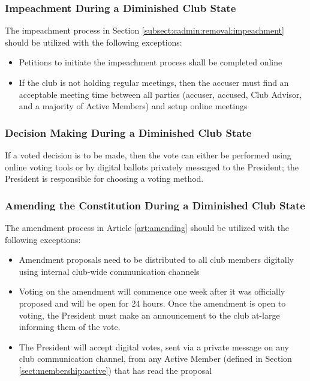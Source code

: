 \documentclass[english,11pt]{article}
\begin{document}
\subsubsection{Impeachment During a Diminished Club State} \label{subsect:reduced:impeachment}
The impeachment process in Section \ref{subsect:cadmin:removal:impeachment} should be utilized with the following exceptions:

\begin{itemize}
    \item Petitions to initiate the impeachment process shall be completed online
    \item If the club is not holding regular meetings, then the accuser must find an acceptable meeting time between all parties (accuser, accused, Club Advisor, and a majority of Active Members) and setup online meetings
\end{itemize}

\subsubsection{Decision Making During a Diminished Club State} \label{subsect:reduced:decisions}
If a voted decision is to be made, then the vote can either be performed using online voting tools or by digital ballots privately messaged to the President; the President is responsible for choosing a voting method.

\subsubsection{Amending the Constitution During a Diminished Club State} \label{subsect:reduced:amending}
The amendment process in Article \ref{art:amending} should be utilized with the following exceptions:

\begin{itemize}
    \item Amendment proposals need to be distributed to all club members digitally using internal club-wide communication channels
    \item Voting on the amendment will commence one week after it was officially proposed and will be open for 24 hours.
        Once the amendment is open to voting, the President must make an announcement to the club at-large informing them of the vote.
    \item The President will accept digital votes, sent via a private message on any club communication channel, from any Active Member (defined in Section \ref{sect:membership:active}) that has read the proposal
\end{itemize}
\end{document}
